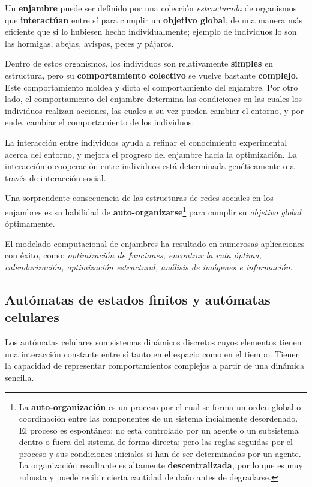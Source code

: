 \documentclass[10pt,a4paper]{article}
\begin{document}
Un \textbf{enjambre} puede ser definido por una colección \textit{estructurada} de organismos que \textbf{interactúan} entre sí para cumplir un \textbf{objetivo global}, de una manera más eficiente que si lo hubiesen hecho individualmente; ejemplo de individuos lo son las hormigas, abejas, avispas, peces y pájaros. 

Dentro de estos organismos, los individuos son relativamente \textbf{simples} en estructura, pero su \textbf{comportamiento colectivo} se vuelve bastante \textbf{complejo}. Este comportamiento moldea y dicta el comportamiento del enjambre. Por otro lado, el comportamiento del enjambre determina las condiciones en las cuales los individuos realizan acciones, las cuales a su vez pueden cambiar el entorno, y por ende, cambiar el comportamiento de los individuos.

La interacción entre individuos ayuda a refinar el conocimiento experimental acerca del entorno, y mejora el progreso del enjambre hacia la optimización. La interacción o cooperación entre individuos está determinada genéticamente o a través de interacción social.

Una sorprendente consecuencia de las estructuras de redes sociales en los enjambres es su habilidad de \textbf{auto-organizarse}\footnote{La \textbf{auto-organización} es un proceso por el cual se forma un orden global o coordinación entre las componentes de un sistema incialmente desordenado. El proceso es espontáneo: no está controlado por un agente o un subsistema dentro o fuera del sistema de forma directa; pero las reglas seguidas por el proceso y sus condiciones iniciales si han de ser determinadas por un agente. La organización resultante es altamente \textbf{descentralizada}, por lo que es muy robusta y puede recibir cierta cantidad de daño antes de degradarse.} para cumplir su \textit{objetivo global} óptimamente.

El modelado computacional de enjambres ha resultado en numerosas aplicaciones con éxito, como: \textit{optimización de funciones, encontrar la ruta óptima, calendarización, optimización estructural, análisis de imágenes e información}.

\subsection{Autómatas de estados finitos y autómatas celulares}

Los autómatas celulares son sistemas dinámicos discretos cuyos elementos tienen una interacción constante entre sí tanto en el espacio como en el tiempo.  Tienen la capacidad de representar comportamientos complejos a partir de una dinámica sencilla. 
\end{document}
